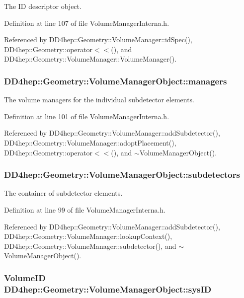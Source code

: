 The ID descriptor object. 

Definition at line 107 of file VolumeManagerInterna.h.

Referenced by DD4hep::Geometry::VolumeManager::idSpec(), DD4hep::Geometry::operator$<$$<$(), and DD4hep::Geometry::VolumeManager::VolumeManager().\hypertarget{class_d_d4hep_1_1_geometry_1_1_volume_manager_object_aff0c698fcc27fa3778734a5c5bd6074f}{
\subsubsection[{managers}]{ {\bf DD4hep::Geometry::VolumeManagerObject::managers}}}
\label{class_d_d4hep_1_1_geometry_1_1_volume_manager_object_aff0c698fcc27fa3778734a5c5bd6074f}


The volume managers for the individual subdetector elements. 

Definition at line 101 of file VolumeManagerInterna.h.

Referenced by DD4hep::Geometry::VolumeManager::addSubdetector(), DD4hep::Geometry::VolumeManager::adoptPlacement(), DD4hep::Geometry::operator$<$$<$(), and $\sim$VolumeManagerObject().\hypertarget{class_d_d4hep_1_1_geometry_1_1_volume_manager_object_aaf80d4d14783bbcdc05eefe7d35519dc}{
\subsubsection[{subdetectors}]{ {\bf DD4hep::Geometry::VolumeManagerObject::subdetectors}}}
\label{class_d_d4hep_1_1_geometry_1_1_volume_manager_object_aaf80d4d14783bbcdc05eefe7d35519dc}


The container of subdetector elements. 

Definition at line 99 of file VolumeManagerInterna.h.

Referenced by DD4hep::Geometry::VolumeManager::addSubdetector(), DD4hep::Geometry::VolumeManager::lookupContext(), DD4hep::Geometry::VolumeManager::subdetector(), and $\sim$VolumeManagerObject().\hypertarget{class_d_d4hep_1_1_geometry_1_1_volume_manager_object_a52c95661de580da96a5585da48064e58}{
\subsubsection[{sysID}]{\setlength{\rightskip}{0pt plus 5cm}VolumeID {\bf DD4hep::Geometry::VolumeManagerObject::sysID}}}
\label{class_d_d4hep_1_1_geometry_1_1_volume_manager_object_a52c95661de580da96a5585da48064e58}


